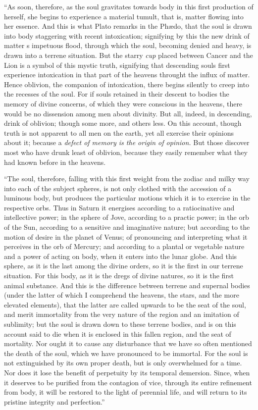 \documentclass[a4paper,12pt]{article}
\begin{document}
{``As soon, therefore, as the soul gravitates towards body in this first
production of herself, she begins to experience a material tumult, that is,
matter flowing into her essence. And this is what Plato remarks in the
Ph{\ae}do, that the soul is drawn into body staggering with recent
intoxication; signifying by this the new drink of matter s impetuous flood,
through which the soul, becoming denied and heavy, is drawn into a terrene
situation. But the starry \textit{cup} placed between Cancer and the Lion is a
symbol of this mystic truth, signifying that descending souls first experience
intoxication in that part of the heavens throught the influx of matter. Hence
oblivion, the companion of intoxication, there begins silently to creep into
the recesses of the soul. For if souls retained in their descent to bodies the
memory of divine concerns, of which they were conscious in the heavens, there
would be no dissension among men about divinity. But all, indeed, in
descending, drink of oblivion; though some more, and others less. On this
account, though truth is not apparent to all men on the earth, yet all exercise
their opinions about it; because a \textit{defect of memory is the origin of
opinion.} But those discover most who have drunk least of oblivion, because
they easily remember what they had known before in the heavens.

``The soul, therefore, falling with this first weight from the zodiac and milky
way into each of the subject spheres, is not only clothed with the accession of
a luminous body, but produces the particular motions which it is to exercise in
the respective orbs. Thus in Saturn it energises according to a ratiocinative
and intellective power; in the sphere of Jove, according to a practic power; in
the orb of the Sun, according to a sensitive and imaginative nature; but
according to the motion of desire in the planet of Venus; of pronouncing and
interpreting what it perceives in the orb of Mercury; and according to a
plantal or vegetable nature and a power of acting on body, when it enters into
the lunar globe. And this sphere, as it is the last among the divine orders, so
it is the first in our terrene situation. For this body, as it is the dregs of
divine natures, so it is the first animal substance. And this is the difference
between terrene and supernal bodies (under the latter of which I comprehend the
heavens, the stars, and the more elevated elements), that the latter are called
upwards to be the seat of the soul, and merit immortality from the very nature
of the region and an imitation of sublimity; but the soul is drawn down to
these terrene bodies, and is on this account said to die when it is enclosed in
this fallen region, and the seat of mortality. Nor ought it to cause any
disturbance that we have so often mentioned the death of the soul, which we
have pronounced to be immortal. For the soul is not extinguished by its own
proper death, but is only overwhelmed for a time. Nor does it lose the benefit
of perpetuity by its temporal demersion. Since, when it deserves to be purified
from the contagion of vice, through its entire refinement from body, it will be
restored to the light of perennial life, and will return to its pristine
integrity and perfection.''

}
\end{document}
